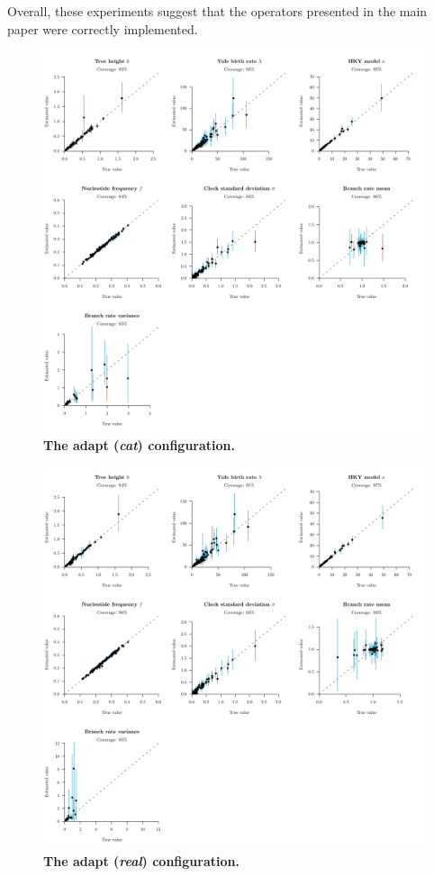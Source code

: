 \documentclass[12pt]{article}
\begin{document}
Overall, these experiments suggest that the operators presented in the main paper were correctly implemented.




\begin{figure}[!htb]
\includegraphics[width=\textwidth]{RatesWCSS/WCSS_cat_adaptive.pdf}
\caption{\textbf{The adapt (\textit{cat}) configuration.} }
\end{figure}


\begin{figure}[!htb]
\includegraphics[width=\textwidth]{RatesWCSS/WCSS_real_adaptive.pdf}
\caption{\textbf{The adapt (\textit{real}) configuration.} }
\end{figure}
\end{document}
